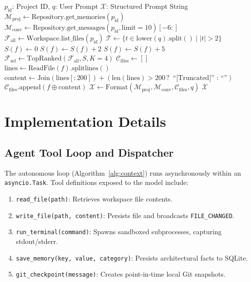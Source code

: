\documentclass[conference]{IEEEtran}
\begin{document}
\begin{algorithm}[t]
\caption{Codebase Context Assembly}
\label{alg:context}
\begin{algorithmic}[1]
\REQUIRE $p_{\text{id}}$: Project ID, $q$: User Prompt
\ENSURE $\mathcal{X}$: Structured Prompt String
\STATE $\mathcal{M}_{\text{proj}} \leftarrow \text{Repository.get\_memories}(p_{\text{id}})$
\STATE $\mathcal{M}_{\text{conv}} \leftarrow \text{Repository.get\_messages}(p_{\text{id}}, \text{limit}=10)[-6:]$
\STATE $\mathcal{F}_{\text{all}} \leftarrow \text{Workspace.list\_files}(p_{\text{id}})$
\STATE $\mathcal{T} \leftarrow \{ t \in \text{lower}(q).\text{split}() \mid |t| > 2 \}$
    \STATE $S(f) \leftarrow 0$
        \STATE $S(f) \leftarrow S(f) + 2$
    \ENDIF
            \STATE $S(f) \leftarrow S(f) + 5$
        \ENDIF
    \ENDFOR
\ENDFOR
\STATE $\mathcal{F}_{\text{sel}} \leftarrow \text{TopRanked}(\mathcal{F}_{\text{all}}, S, K=4)$
\STATE $\mathcal{C}_{\text{files}} \leftarrow []$
    \STATE $\text{lines} \leftarrow \text{ReadFile}(f).\text{splitlines}()$
    \STATE $\text{content} \leftarrow \text{Join}(\text{lines}[:200]) + (\text{len}(\text{lines}) > 200 \mathrel{?} \text{ ``[Truncated]'' : ``''})$
    \STATE $\mathcal{C}_{\text{files}}.\text{append}(f \oplus \text{content})$
\ENDFOR
\STATE $\mathcal{X} \leftarrow \text{Format}(\mathcal{M}_{\text{proj}}, \mathcal{M}_{\text{conv}}, \mathcal{C}_{\text{files}}, q)$
\RETURN $\mathcal{X}$
\end{algorithmic}
\end{algorithm}

\section{Implementation Details}

\subsection{Agent Tool Loop and Dispatcher}
The autonomous loop (Algorithm~\ref{alg:context}) runs asynchronously within an \texttt{asyncio.Task}. Tool definitions exposed to the model include:
\begin{enumerate}
    \item \texttt{read\_file(path)}: Retrieves workspace file contents.
    \item \texttt{write\_file(path, content)}: Persists file and broadcasts \texttt{FILE\_CHANGED}.
    \item \texttt{run\_terminal(command)}: Spawns sandboxed subprocesses, capturing stdout/stderr.
    \item \texttt{save\_memory(key, value, category)}: Persists architectural facts to SQLite.
    \item \texttt{git\_checkpoint(message)}: Creates point-in-time local Git snapshots.
\end{enumerate}
\end{document}
